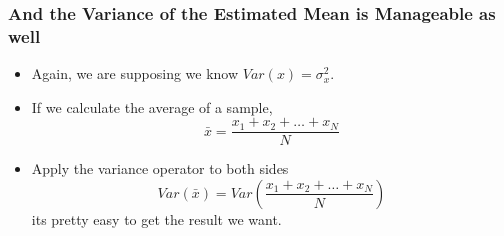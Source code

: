 \documentclass[10pt,english]{beamer}
\begin{document}
\begin{frame}
  \frametitle{And the Variance of the Estimated Mean is Manageable as well}

  \begin{itemize}
    \item Again, we are supposing we know $Var(x) = \sigma_{x}^2$.
    \item If we calculate the average of a sample,
      \begin{displaymath}
        \bar{x} = \frac{x_1 + x_2 + \ldots + x_N}{N}
      \end{displaymath}
    \item Apply the variance operator to both sides
      \begin{displaymath}
        Var(\bar{x}) = Var(\frac{x_1 + x_2 + \ldots + x_N}{N})
      \end{displaymath}
      its pretty easy to get the result we want.

   \end{itemize}
 \end{frame}
\end{document}
